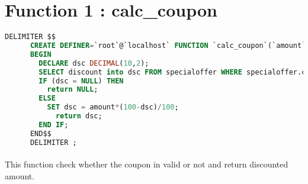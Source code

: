     \section{Function 1 : calc\_coupon}
    \ttfamily
      \begin{lstlisting}[language=SQL]
      DELIMITER $$
      CREATE DEFINER=`root`@`localhost` FUNCTION `calc_coupon`(`amount` DECIMAL(10,2), `couponcode` VARCHAR(50)) RETURNS decimal(10,2) unsigned
      BEGIN
        DECLARE dsc DECIMAL(10,2);
        SELECT discount into dsc FROM specialoffer WHERE specialoffer.code = couponcode;
        IF (dsc = NULL) THEN
          return NULL;
        ELSE
          SET dsc = amount*(100-dsc)/100;
            return dsc;
        END IF;
      END$$
      DELIMITER ;
      \end{lstlisting}
      \rmfamily
      \paragraph{}
        This function check whether the coupon in valid or not and return discounted amount.



